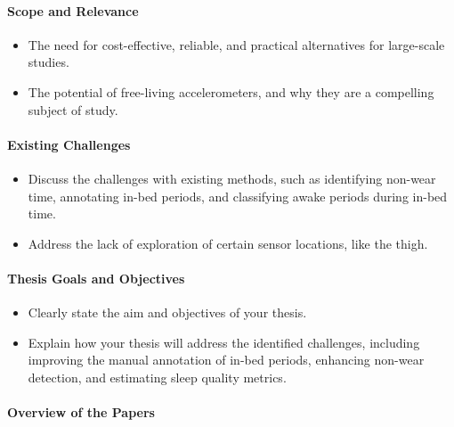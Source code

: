\documentclass[
  9pt,
]{article}
\let\oldparagraph\paragraph
\renewcommand{\paragraph}[1]{\oldparagraph{#1}\mbox{}}
\providecommand{\tightlist}{%
  \setlength{\itemsep}{0pt}\setlength{\parskip}{0pt}}\usepackage{longtable,booktabs,array}
\begin{document}
\hypertarget{scope-and-relevance}{%
\paragraph{Scope and Relevance}\label{scope-and-relevance}}

\begin{itemize}
\tightlist
\item
  The need for cost-effective, reliable, and practical alternatives for
  large-scale studies.
\item
  The potential of free-living accelerometers, and why they are a
  compelling subject of study.
\end{itemize}

\hypertarget{existing-challenges}{%
\paragraph{Existing Challenges}\label{existing-challenges}}

\begin{itemize}
\tightlist
\item
  Discuss the challenges with existing methods, such as identifying
  non-wear time, annotating in-bed periods, and classifying awake
  periods during in-bed time.
\item
  Address the lack of exploration of certain sensor locations, like the
  thigh.
\end{itemize}

\hypertarget{thesis-goals-and-objectives}{%
\paragraph{Thesis Goals and
Objectives}\label{thesis-goals-and-objectives}}

\begin{itemize}
\tightlist
\item
  Clearly state the aim and objectives of your thesis.
\item
  Explain how your thesis will address the identified challenges,
  including improving the manual annotation of in-bed periods, enhancing
  non-wear detection, and estimating sleep quality metrics.
\end{itemize}

\hypertarget{overview-of-the-papers}{%
\paragraph{Overview of the Papers}\label{overview-of-the-papers}}
\end{document}
